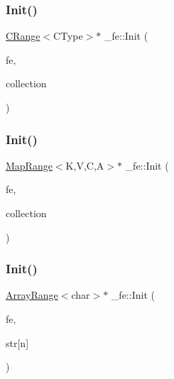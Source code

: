 \mbox{\label{namespace__fe_ab52430a70b90e012572f22d6cc8ce2c6}} 
\subsubsection{\texorpdfstring{Init()}{Init()}\hspace{0.1cm}{\footnotesize\ttfamily [1/6]}}
{\footnotesize\ttfamily \mbox{\hyperlink{struct__fe_1_1CRange}{C\+Range}}$<$C\+Type$>$$\ast$ \+\_\+fe\+::\+Init (\begin{DoxyParamCaption}\item[{\mbox{\hyperlink{struct__fe_1_1State}{State}} \&}]{fe,  }\item[{const C\+Type \&}]{collection }\end{DoxyParamCaption})}

\mbox{\label{namespace__fe_a6915d77d3a0b12e3f6c2df62f91d0384}} 
\subsubsection{\texorpdfstring{Init()}{Init()}\hspace{0.1cm}{\footnotesize\ttfamily [2/6]}}
{\footnotesize\ttfamily \mbox{\hyperlink{struct__fe_1_1MapRange}{Map\+Range}}$<$K,V,C,A$>$$\ast$ \+\_\+fe\+::\+Init (\begin{DoxyParamCaption}\item[{\mbox{\hyperlink{struct__fe_1_1State}{State}} \&}]{fe,  }\item[{const std\+::map$<$ K, V, C, A $>$ \&}]{collection }\end{DoxyParamCaption})}

\mbox{\label{namespace__fe_a4012c80921f7f917e93984043e45489c}} 
\subsubsection{\texorpdfstring{Init()}{Init()}\hspace{0.1cm}{\footnotesize\ttfamily [3/6]}}
{\footnotesize\ttfamily \mbox{\hyperlink{struct__fe_1_1ArrayRange}{Array\+Range}}$<$char$>$$\ast$ \+\_\+fe\+::\+Init (\begin{DoxyParamCaption}\item[{\mbox{\hyperlink{struct__fe_1_1State}{State}} \&}]{fe,  }\item[{char(\&)}]{str\mbox{[}n\mbox{]} }\end{DoxyParamCaption})}

